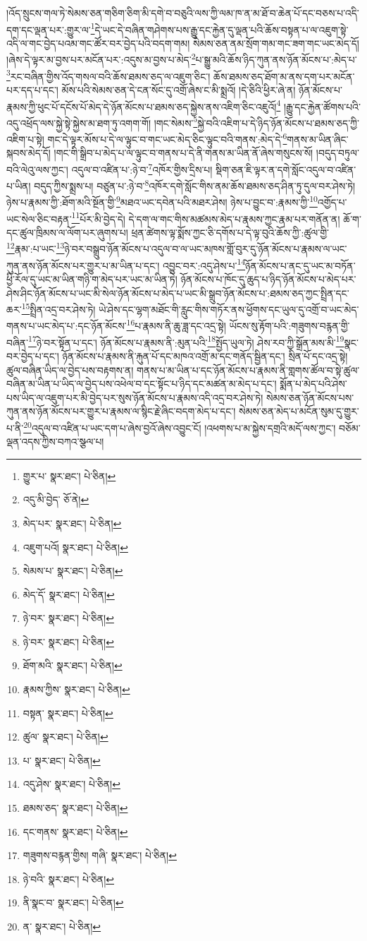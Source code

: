 །འོད་སྲུངས་གལ་ཏེ་སེམས་ཅན་གཅིག་ཅིག་མི་དགེ་བ་བཅུའི་ལས་ཀྱི་ལམ་ཁ་ན་མ་ཐོ་བ་ཆེན་པོ་དང་བཅས་པ་འདི་དག་དང་ལྡན་པར་:གྱུར་ལ་\footnote{གྱུར་པ་  སྣར་ཐང་།  པེ་ཅིན། }དེ་ཡང་དེ་བཞིན་གཤེགས་པས་རྒྱུ་དང་རྐྱེན་དུ་ལྡན་པའི་ཆོས་བསྟན་པ་ལ་འཇུག་སྟེ་འདི་ལ་གང་བྱེད་པའམ་གང་ཚོར་བར་བྱེད་པའི་བདག་གམ། སེམས་ཅན་ནམ་སྲོག་གམ་གང་ཟག་གང་ཡང་མེད་དོ། །ཞེས་དེ་ལྟར་མ་བྱས་པར་མངོན་པར་:འདུས་མ་བྱས་པ་མེད་\footnote{འདུ་མི་བྱེད་  ཅོ་ནེ། }པ་སྒྱུ་མའི་ཆོས་ཉིད་ཀུན་ནས་ཉོན་མོངས་པ་:མེད་པ་\footnote{མེད་པར་  སྣར་ཐང་།  པེ་ཅིན། }རང་བཞིན་གྱིས་འོད་གསལ་བའི་ཆོས་ཐམས་ཅད་ལ་འཇུག་ཅིང་། ཆོས་ཐམས་ཅད་ཐོག་མ་ནས་དག་པར་མངོན་པར་དད་པ་དང་། མོས་པའི་སེམས་ཅན་དེ་ངན་སོང་དུ་འགྲོ་ཞེས་ང་མི་སྨྲའོ། །དེ་ཅིའི་ཕྱིར་ཞེ་ན། ཉོན་མོངས་པ་རྣམས་ཀྱི་ཕུང་པོ་དངོས་པོ་མེད་དེ་ཉོན་མོངས་པ་ཐམས་ཅད་སྐྱེས་ནས་འཇིག་ཅིང་འཇུའོ།\footnote{འཇུག་པའོ།  སྣར་ཐང་།  པེ་ཅིན། } །རྒྱུ་དང་རྐྱེན་ཚོགས་པའི་འདུ་འཕྲོད་ལས་སྐྱེ་སྟེ་སྐྱེས་མ་ཐག་ཏུ་འགག་གོ། །གང་སེམས་\footnote{སེམས་པ་  སྣར་ཐང་།  པེ་ཅིན། }སྐྱེ་བའི་འཇིག་པ་དེ་ཉིད་ཉོན་མོངས་པ་ཐམས་ཅད་ཀྱི་འཇིག་པ་སྟེ། གང་དེ་ལྟར་མོས་པ་དེ་ལ་ལྟུང་བ་གང་ཡང་མེད་ཅིང་ལྟུང་བའི་གནས་:མེད་དེ་\footnote{མེད་དོ་  སྣར་ཐང་།  པེ་ཅིན། }གནས་མ་ཡིན་ཞིང་སྐབས་མེད་དོ། །གང་གི་སྒྲིབ་པ་མེད་པ་ལ་ལྟུང་བ་གནས་པ་དེ་ནི་གནས་མ་ཡིན་ནོ་ཞེས་གསུངས་སོ། །བདུད་བཏུལ་བའི་ལེའུ་ལས་ཀྱང་། འདུལ་བ་འཛིན་པ་:ཉེ་བ་\footnote{ཉེ་བར་  སྣར་ཐང་།  པེ་ཅིན། }འཁོར་གྱིས་དྲིས་པ། སྡིག་ཅན་ཇི་ལྟར་ན་དགེ་སློང་འདུལ་བ་འཛིན་པ་ཡིན། བདུད་ཀྱིས་སྨྲས་པ། བཙུན་པ་:ཉེ་བ་\footnote{ཉེ་བར་  སྣར་ཐང་།  པེ་ཅིན། }འཁོར་དགེ་སློང་གིས་ནམ་ཆོས་ཐམས་ཅད་ཤིན་ཏུ་དུལ་བར་ཤེས་ཏེ། ཉེས་པ་རྣམས་ཀྱི་:ཐོག་མའི་སྔོན་གྱི་\footnote{ཐོག་མའི་  སྣར་ཐང་།  པེ་ཅིན། }མཐའ་ཡང་དབེན་པའི་མཐར་ཤེས། ཉེས་པ་བྱུང་བ་:རྣམས་ཀྱི་\footnote{རྣམས་ཀྱིས་  སྣར་ཐང་།  པེ་ཅིན། }འགྱོད་པ་ཡང་སེལ་ཅིང་བརྟན་\footnote{བསྟན་  སྣར་ཐང་།  པེ་ཅིན། }པོར་མི་བྱེད་དེ། དེ་དག་ལ་གང་གིས་མཚམས་མེད་པ་རྣམས་ཀྱང་རྣམ་པར་གནོན་ན། ཆོ་ག་དང་ཚུལ་ཁྲིམས་ལ་ལོག་པར་ཞུགས་པ། ཕྲན་ཚེགས་ལྟ་སྨོས་ཀྱང་ཅི་དགོས་པ་དེ་ལྟ་བུའི་ཆོས་ཀྱི་:ཚུལ་གྱི་\footnote{ཚུལ་  སྣར་ཐང་།  པེ་ཅིན། }རྣམ་:པ་ཡང་\footnote{པ་  སྣར་ཐང་།  པེ་ཅིན། }ཉེ་བར་བསྒྲུབ་ཉོན་མོངས་པ་འདུལ་བ་ལ་ཡང་མཁས་གློ་བུར་དུ་ཉོན་མོངས་པ་རྣམས་ལ་ཡང་ཀུན་ནས་ཉོན་མོངས་པར་གྱུར་པ་མ་ཡིན་པ་དང་། འབྱུང་བར་:འདུ་ཤེས་པ་\footnote{འདུ་ཤེས་  སྣར་ཐང་།  པེ་ཅིན། }ཉོན་མོངས་པ་ནང་དུ་ཡང་མ་བཏོན་ཕྱི་རོལ་དུ་ཡང་མ་ཡིན་གཉི་ག་མེད་པར་ཡང་མ་ཡིན་ཏེ། ཉོན་མོངས་པ་ཁོང་དུ་ཆུད་པ་ཉིད་ཉོན་མོངས་པ་མེད་པར་ཤེས་ཤིང་ཉོན་མོངས་པ་ཡང་མི་སེལ་ཉོན་མོངས་པ་མེད་པ་ཡང་མི་སྒྲུབ་ཉོན་མོངས་པ་:ཐམས་ཅད་ཀྱང་སྤྲིན་དང་ཆར་\footnote{ཐམས་ཅད་  སྣར་ཐང་།  པེ་ཅིན། }སྤྲིན་འདྲ་བར་ཤེས་ཏེ། ཡེ་ཤེས་དང་ལྷག་མཐོང་གི་རླུང་གིས་གཏོར་ནས་ཕྱོགས་དང་ཡུལ་དུ་འགྲོ་བ་ཡང་མེད་གནས་པ་ཡང་མེད་པ་:དང་ཉོན་མོངས་\footnote{དང་གནས་  སྣར་ཐང་།  པེ་ཅིན། }པ་རྣམས་ནི་ཆུ་ཟླ་དང་འདྲ་སྟེ། ཡོངས་སུ་རྟོག་པའི་:གཟུགས་བརྙན་གྱི་བཞིན་\footnote{གཟུགས་བརྙན་གྱིས། གཞི་  སྣར་ཐང་།  པེ་ཅིན། }ཉེ་བར་སྟོན་པ་དང་། ཉོན་མོངས་པ་རྣམས་ནི་:མུན་པའི་\footnote{ཉེ་བའི་  སྣར་ཐང་།  པེ་ཅིན། }སྤྱོད་ཡུལ་ཏེ། ཤེས་རབ་ཀྱི་སྒྲོན་མས་མི་\footnote{ནི་སྣང་བ་  སྣར་ཐང་།  པེ་ཅིན། }སྣང་བར་བྱེད་པ་དང་། ཉོན་མོངས་པ་རྣམས་ནི་རྐུན་པོ་དང་མཁའ་འགྲོ་མ་དང་གནོད་སྦྱིན་དང་། སྲིན་པོ་དང་འདྲ་སྟེ། ཚུལ་བཞིན་ཡིད་ལ་བྱེད་པས་བརྟགས་ན། གནས་པ་མ་ཡིན་པ་དང་ཉོན་མོངས་པ་རྣམས་ནི་གླགས་ཚོལ་བ་སྟེ་ཚུལ་བཞིན་མ་ཡིན་པ་ཡིད་ལ་བྱེད་པས་འཕེལ་བ་དང་སྟོང་པ་ཉིད་དང་མཚན་མ་མེད་པ་དང་། སྨོན་པ་མེད་པའི་ཤེས་པས་ཡིད་ལ་འཇུག་པར་མི་བྱེད་པར་སུས་ཉོན་མོངས་པ་རྣམས་འདི་འདྲ་བར་ཤེས་ཏེ། སེམས་ཅན་ཉོན་མོངས་པས་ཀུན་ནས་ཉོན་མོངས་པར་གྱུར་པ་རྣམས་ལ་སྙིང་རྗེ་ཞིང་བདག་མེད་པ་དང་། སེམས་ཅན་མེད་པ་མངོན་སུམ་དུ་གྱུར་པ་ནི་\footnote{ན་  སྣར་ཐང་།  པེ་ཅིན། }འདུལ་བ་འཛིན་པ་ཡང་དག་པ་ཞེས་བྱའོ་ཞེས་འབྱུང་ངོ། །འཕགས་པ་མ་སྐྱེས་དགྲའི་མདོ་ལས་ཀྱང་། བཅོམ་ལྡན་འདས་ཀྱིས་བཀའ་སྩལ་པ། 